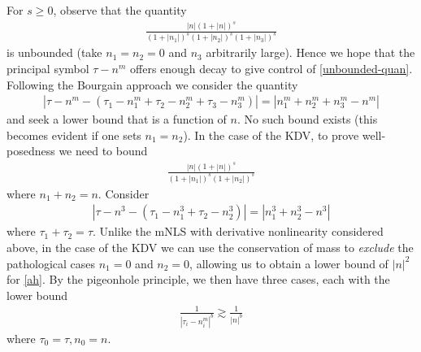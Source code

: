 \documentclass[12pt,reqno]{amsart}
\numberwithin{equation}{section}  %
\numberwithin{figure}{section}
\theoremstyle{plain}
\theoremstyle{definition}
\theoremstyle{remark}
\begin{document}
%
%
For $s \ge 0$, observe that the quantity 
%
%
\begin{equation}
	\label{unbounded-quan}
	\begin{split}
		\frac{| n | \left (1 + |n| \right ) ^s}{\left (1 + |n_1| \right ) ^s \left (1 + |n_2| \right ) ^s \left (1 + |n_3| \right ) ^s} 
	\end{split}
\end{equation}
is unbounded (take $n_1 = n_2 = 0$ and $n_3$ arbitrarily large). Hence
we hope that the  principal symbol $\tau - n^m$ offers enough
decay to give control of \eqref{unbounded-quan}. Following the Bourgain
approach we consider the quantity
%
%
\begin{equation*}
	\begin{split}
		| \tau - n^{m} - \left( \tau_{1} - n_{1}^m + \tau_{2} - n_{2}^m +
		\tau_{3} - n_{3}^m \right) | = |n_{1}^m + n_2^m + n_3^m - n^m|
	\end{split}
\end{equation*}
%
%
and seek a lower bound that is a function of $n$. No such bound exists (this
becomes evident if one sets $n_1 = n_2$). In the case of the KDV, to prove well-posedness we need to bound
\begin{equation}
	\label{KDV-bound-term}
	\begin{split}
		\frac{| n | \left (1 + |n| \right ) ^s}{\left (1 + |n_1| \right ) ^s \left (1 + |n_2| \right ) ^s} 
	\end{split}
\end{equation}
where $n_1 + n_2 = n$. 
Consider 
%
%
\begin{equation}
  \label{ah}
	\begin{split}
		| \tau - n^{3} - \left( \tau_{1} - n_{1}^3 + \tau_{2} - n_{2}^3 \right) | = |n_{1}^3 + n_2^3 - n^3|
	\end{split}
\end{equation}
where  $\tau_1 + \tau_2 = \tau$. Unlike the mNLS with derivative nonlinearity
considered above, in the case of the KDV we can use the conservation of mass to
\emph{exclude} the pathological cases $n_1=0$ and $n_2=0$, allowing us to obtain
a lower bound of $|n|^{2}$ for \eqref{ah}.
By the pigeonhole principle, we then have three
cases, each with the lower bound
%
%
\begin{equation*}
	\begin{split}
		\frac{1}{| \tau_{i} - n_{i}^{m} |^{b}} \gtrsim \frac{1}{|n|^{b}}	
	\end{split}
\end{equation*}
%
%
where $\tau_0 =\tau, n_0 = n$. 
\end{document}
